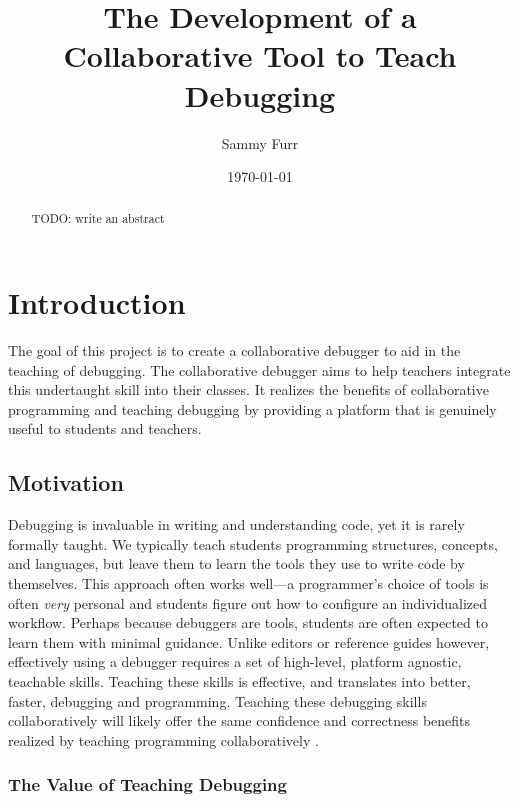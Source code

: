 \documentclass[12pt]{article}
\author{Sammy Furr}
\title{The Development of a Collaborative Tool to Teach Debugging}
\date{\today}
\begin{document}
\begin{titlepage}
  \maketitle
\end{titlepage}

\begin{abstract}
  TODO: write an abstract
\end{abstract}

\tableofcontents
\pagebreak

\section{Introduction}

The goal of this project is to create a collaborative debugger to aid
in the teaching of debugging.  The collaborative debugger aims to help
teachers integrate this undertaught skill into their classes.  It
realizes the benefits of collaborative programming and teaching
debugging by providing a platform that is genuinely useful to students
and teachers.

\subsection{Motivation}

Debugging is invaluable in writing and understanding code, yet it is
rarely formally taught\cite{doi:10.1080/08993400802114581}.  We
typically teach students programming structures, concepts, and
languages, but leave them to learn the tools they use to write code by
themselves.  This approach often works well---a programmer's choice of
tools is often \textit{very} personal and students figure out how to
configure an individualized workflow.  Perhaps because debuggers are
tools, students are often expected to learn them with minimal
guidance.  Unlike editors or reference guides however, effectively
using a debugger requires a set of high-level, platform agnostic,
teachable skills.  Teaching these skills is effective, and translates
into better, faster, debugging and
programming\cite{10.1145/3286960.3286970}\cite{10.1145/3361721.3361724}.
Teaching these debugging skills collaboratively will likely offer the
same confidence and correctness benefits realized by teaching
programming collaboratively
\cite{10.1145/1026487.1008043}\cite{10.1145/1145287.1145293}.

\subsubsection{The Value of Teaching Debugging}
\end{document}
